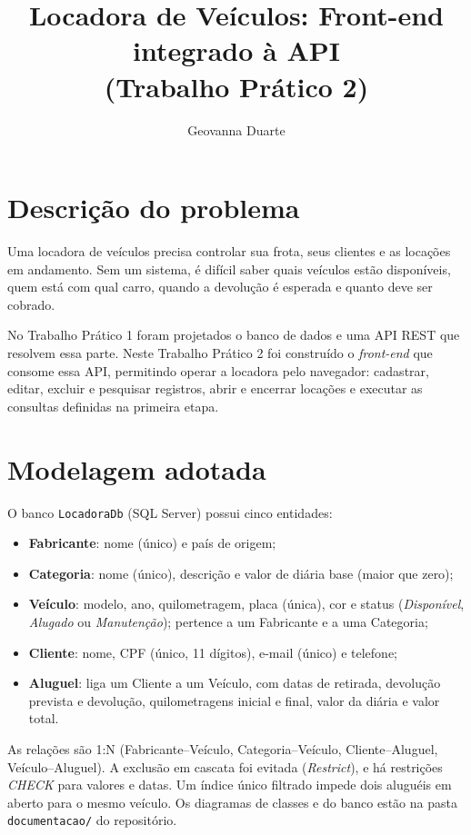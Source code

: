 \documentclass[12pt]{article}
\title{Locadora de Veículos: Front-end integrado à API\\
(Trabalho Prático 2)}
\author{Geovanna Duarte}
\begin{document}
\maketitle

\section{Descrição do problema}

Uma locadora de veículos precisa controlar sua frota, seus clientes e as locações em andamento. Sem um sistema, é difícil saber quais veículos estão disponíveis, quem está com qual carro, quando a devolução é esperada e quanto deve ser cobrado.

No Trabalho Prático 1 foram projetados o banco de dados e uma API REST que resolvem essa parte. Neste Trabalho Prático 2 foi construído o \textit{front-end} que consome essa API, permitindo operar a locadora pelo navegador: cadastrar, editar, excluir e pesquisar registros, abrir e encerrar locações e executar as consultas definidas na primeira etapa.

\section{Modelagem adotada}

O banco \texttt{LocadoraDb} (SQL Server) possui cinco entidades:

\begin{itemize}
  \item \textbf{Fabricante}: nome (único) e país de origem;
  \item \textbf{Categoria}: nome (único), descrição e valor de diária base (maior que zero);
  \item \textbf{Veículo}: modelo, ano, quilometragem, placa (única), cor e status (\textit{Disponível}, \textit{Alugado} ou \textit{Manutenção}); pertence a um Fabricante e a uma Categoria;
  \item \textbf{Cliente}: nome, CPF (único, 11 dígitos), e-mail (único) e telefone;
  \item \textbf{Aluguel}: liga um Cliente a um Veículo, com datas de retirada, devolução prevista e devolução, quilometragens inicial e final, valor da diária e valor total.
\end{itemize}

As relações são 1:N (Fabricante--Veículo, Categoria--Veículo, Cliente--Aluguel, Veículo--Aluguel). A exclusão em cascata foi evitada (\textit{Restrict}), e há restrições \textit{CHECK} para valores e datas. Um índice único filtrado impede dois aluguéis em aberto para o mesmo veículo. Os diagramas de classes e do banco estão na pasta \texttt{documentacao/} do repositório.
\end{document}
